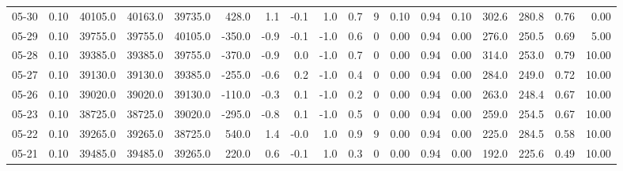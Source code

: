 \begin{threeparttable}
{\begin{tabular}{lrrrrrrrrrrrrrrrrr}
  05-30 &     0.10 & 40105.0 & 40163.0 & 39735.0 &      428.0 &            1.1 &                      -0.1 &                      1.0 &                 0.7 &              9 &       0.10 &      0.94 &           0.10 &            302.6 &               280.8 &            0.76 &                   0.00 \\
  05-29 &     0.10 & 39755.0 & 39755.0 & 40105.0 &     -350.0 &           -0.9 &                      -0.1 &                     -1.0 &                 0.6 &              0 &       0.00 &      0.94 &           0.00 &            276.0 &               250.5 &            0.69 &                   5.00 \\
  05-28 &     0.10 & 39385.0 & 39385.0 & 39755.0 &     -370.0 &           -0.9 &                       0.0 &                     -1.0 &                 0.7 &              0 &       0.00 &      0.94 &           0.00 &            314.0 &               253.0 &            0.79 &                  10.00 \\
  05-27 &     0.10 & 39130.0 & 39130.0 & 39385.0 &     -255.0 &           -0.6 &                       0.2 &                     -1.0 &                 0.4 &              0 &       0.00 &      0.94 &           0.00 &            284.0 &               249.0 &            0.72 &                  10.00 \\
  05-26 &     0.10 & 39020.0 & 39020.0 & 39130.0 &     -110.0 &           -0.3 &                       0.1 &                     -1.0 &                 0.2 &              0 &       0.00 &      0.94 &           0.00 &            263.0 &               248.4 &            0.67 &                  10.00 \\
  05-23 &     0.10 & 38725.0 & 38725.0 & 39020.0 &     -295.0 &           -0.8 &                       0.1 &                     -1.0 &                 0.5 &              0 &       0.00 &      0.94 &           0.00 &            259.0 &               254.5 &            0.67 &                  10.00 \\
  05-22 &     0.10 & 39265.0 & 39265.0 & 38725.0 &      540.0 &            1.4 &                      -0.0 &                      1.0 &                 0.9 &              9 &       0.00 &      0.94 &           0.00 &            225.0 &               284.5 &            0.58 &                  10.00 \\
  05-21 &     0.10 & 39485.0 & 39485.0 & 39265.0 &      220.0 &            0.6 &                      -0.1 &                      1.0 &                 0.3 &              0 &       0.00 &      0.94 &           0.00 &            192.0 &               225.6 &            0.49 &                  10.00 \\

\end{tabular}}
\end{threeparttable}
